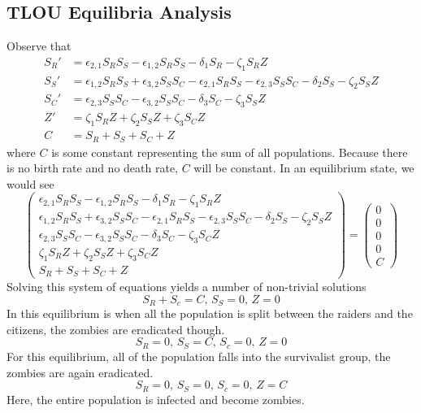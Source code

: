 \documentclass{article}
\begin{document}
\subsection{TLOU Equilibria Analysis}

Observe that
\begin{align*}
    S_R' &= \epsilon_{2,1} S_R S_S - \epsilon_{1,2} S_R S_S - \delta_1 S_R - \zeta_1 S_R Z \\
    S_S' &= \epsilon_{1,2} S_R S_S + \epsilon_{3,2} S_S S_C - \epsilon_{2,1} S_R S_S - \epsilon_{2,3} S_S S_C - \delta_2 S_S - \zeta_2 S_S Z \\
    S_C' &= \epsilon_{2,3} S_S S_C - \epsilon_{3,2} S_S S_C - \delta_3 S_C - \zeta_3 S_S Z \\
    Z'   &= \zeta_1 S_R Z + \zeta_2 S_S Z + \zeta_3 S_C Z \\
    C    &= S_R + S_S + S_C + Z
\end{align*}
where $C$ is some constant representing the sum of all populations. Because there is no birth rate and no death rate, $C$ will be constant. In an equilibrium state, we would see
\[
    \begin{pmatrix}
    \epsilon_{2,1} S_R S_S - \epsilon_{1,2} S_R S_S - \delta_1 S_R - \zeta_1 S_R Z \\
    \epsilon_{1,2} S_R S_S + \epsilon_{3,2} S_S S_C - \epsilon_{2,1} S_R S_S - \epsilon_{2,3} S_S S_C - \delta_2 S_S - \zeta_2 S_S Z \\
    \epsilon_{2,3} S_S S_C - \epsilon_{3,2} S_S S_C - \delta_3 S_C - \zeta_3 S_C Z \\
    \zeta_1 S_R Z + \zeta_2 S_S Z + \zeta_3 S_C Z \\
    S_R + S_S + S_C + Z
    \end{pmatrix}
    =
    \begin{pmatrix}
        0 \\
        0 \\
        0 \\
        0 \\
        C
    \end{pmatrix}
\]
Solving this system of equations yields a number of non-trivial solutions
\[
    S_R + S_c = C,\, S_S = 0,\, Z = 0
\]
In this equilibrium is when all the population is split between the raiders and the citizens, the zombies are eradicated though.
\[
    S_R = 0,\, S_S = C,\, S_c = 0,\, Z = 0 
\]
For this equilibrium, all of the population falls into the survivalist group, the zombies are again eradicated.
\[
    S_R = 0,\, S_S = 0,\, S_c = 0,\, Z = C
\]
Here, the entire population is infected and become zombies.
\end{document}
